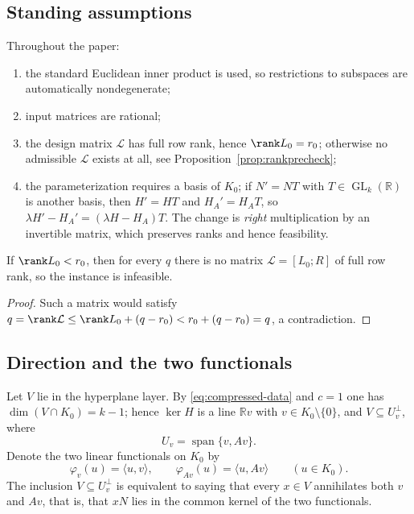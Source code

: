 \subsection{Standing assumptions}
\label{sec:prelim:assumptions}

Throughout the paper:
\begin{enumerate}[label=(\roman*),leftmargin=*,itemsep=2pt]
\item the standard Euclidean inner product is used, so restrictions to subspaces are automatically
nondegenerate;
\item input matrices are rational;
\item the design matrix $\mathcal L$ has full row rank, hence $\rank L_0=r_0$; otherwise no admissible
$\mathcal L$ exists at all, see Proposition~\ref{prop:rankprecheck};
\item the parameterization requires a basis of $K_0$; if $N'=NT$ with $T\in\operatorname{GL}_k(\mathbb R)$
is another basis, then $H'=HT$ and $H_A'=H_AT$, so $\lambda H'-H_A'=(\lambda H-H_A)T$. The change is
\emph{right} multiplication by an invertible matrix, which preserves ranks and hence feasibility.
\end{enumerate}

\begin{prop}
  \label{prop:rankprecheck}
  If $\rank L_0<r_0$, then for every $q$ there is no matrix $\mathcal L=[L_0;R]$ of full row rank, so
  the instance is infeasible.
\end{prop}

\begin{proof}
  Such a matrix would satisfy
  $q=\rank\mathcal L\le\rank L_0+(q-r_0)<r_0+(q-r_0)=q$, a contradiction.
\end{proof}

\subsection{Direction and the two functionals}
\label{sec:prelim:direction}

Let $V$ lie in the hyperplane layer. By \eqref{eq:compressed-data} and $c=1$ one has $\dim(V\cap K_0)=k-1$;
hence $\ker H$ is a line $\mathbb R v$ with $v\in K_0\setminus\{0\}$, and $V\subseteq U_v^\perp$,
where
\begin{equation}
  \label{eq:Uv}
  U_v=\operatorname{span}\{v,Av\}.
\end{equation}
Denote the two linear functionals on $K_0$ by
\begin{equation}
  \label{eq:functionals}
  \varphi_v(u)=\langle u,v\rangle,\qquad \varphi_{Av}(u)=\langle u,Av\rangle
  \qquad(u\in K_0).
\end{equation}
The inclusion $V\subseteq U_v^\perp$ is equivalent to saying that every $x\in V$ annihilates both $v$
and $Av$, that is, that $xN$ lies in the common kernel of the two functionals.

